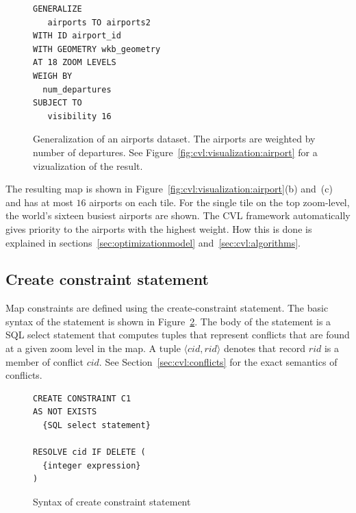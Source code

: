 \documentclass[11pt, oneside]{report}
\begin{document}
\begin{figure}[ht]
\begin{center}
\begin{lstlisting}
GENERALIZE 
   airports TO airports2
WITH ID airport_id
WITH GEOMETRY wkb_geometry
AT 18 ZOOM LEVELS
WEIGH BY
  num_departures
SUBJECT TO 
   visibility 16 
\end{lstlisting}
\vspace*{-1ex}
\caption{Generalization of an airports dataset. The airports are weighted by number of departures. See Figure~\ref{fig:cvl:visualization:airport} for a vizualization of the result.}
\label{fig:cvl:example:airports}
\end{center}
\vspace*{-2ex}
\end{figure}



The resulting map is shown in Figure~\ref{fig:cvl:visualization:airport}(b) and~(c) and has at most $16$ airports on each tile. For the single tile on the top zoom-level, the world's sixteen busiest airports are shown. The CVL framework automatically gives priority to the airports with the highest weight. How this is done is explained in sections~\ref{sec:optimizationmodel} and~\ref{sec:cvl:algorithms}.

\subsection{Create constraint statement}
\label{sec:cvl:create:constraint:statement}

Map constraints are defined using the create-constraint statement.  The basic syntax of the statement is shown in Figure~\ref{fig:create:constraint:syntax}. The body of the statement is a SQL select statement that computes tuples that represent conflicts that are found at a given zoom level in the map. A tuple $\langle cid, rid\rangle$ denotes that record $rid$ is a member of conflict $cid$. See Section~\ref{sec:cvl:conflicts} for the exact semantics of conflicts.

\begin{figure}[ht]
\begin{center}
\begin{lstlisting}
CREATE CONSTRAINT C1
AS NOT EXISTS
  {SQL select statement}
  
RESOLVE cid IF DELETE (
  {integer expression}
)
\end{lstlisting}
\caption{Syntax of create constraint statement}
\label{fig:create:constraint:syntax}
\end{center}
\vspace*{-1ex}
\end{figure}
\end{document}
